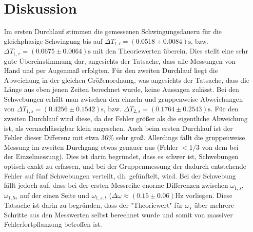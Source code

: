\section{Diskussion}
\label{sec:Diskussion}
Im ersten Durchlauf stimmen die gemessenen Schwingungsdauern für die gleichphasige Schwingung bis auf $\Delta T_{1,l} = (0.0518 \pm 0.0084) \si{\second}$, bzw. $\Delta T_{1,r} = (0.0675 \pm 0.0064) \si{\second}$ mit den Theoriewerten überein. Dies stellt eine sehr gute Übereinstimmung dar, angesichts der Tatsache, dass alle Messungen von Hand und per Augenmaß erfolgten. Für den zweiten Durchlauf liegt die Abweichung in der gleichen Größenordnung, was angesichts der Tatsache, dass die Länge aus eben jenen Zeiten berechnet wurde, keine Aussagen zulässt.
Bei den Schwebungen erhält man zwischen den einzeln und gruppenweise Abweichungen von $\Delta T_{1,s} = (0.4256 \pm 0.1542)\si{\second}$, bzw. $\Delta T_{2,s} = (0.1764 \pm 0.2543)\si{\second}$. Für den zweiten Durchlauf wird diese, da der Fehler größer als die eigentliche Abweichung ist, als vernachlässigbar klein angesehen. Auch beim ersten Durchlauf ist der Fehler dieser Differenz mit etwa $36\%$ sehr groß. Allerdings fällt die gruppenweise Messung im zweiten Durchgang etwas genauer aus (Fehler $<1/3$ von dem bei der Einzelmessung). Dies ist darin begründet, dass es schwer ist, Schwebungen optisch exakt zu erfassen, und bei der Gruppenmessung der dadurch entstehende Fehler auf fünf Schwebungen verteilt, dh. gefünftelt, wird.
Bei der Schwebung fällt jedoch auf, dass bei der ersten Messreihe enorme Differenzen zwischen $\omega_{1,s}$, $\omega_{1,5s}$ auf der einen Seite und $\omega_{1,s,t}$ ($\Delta \omega \approx (0.15 \pm 0.06) \si{\hertz}$ vorliegen. Diese Tatsache ist darin zu begründen, dass der "Theoriewert" für $\omega_s$ über mehrere Schritte aus den Messwerten selbst berechnet wurde und somit von massiver Fehlerfortpflanzung betroffen ist.
